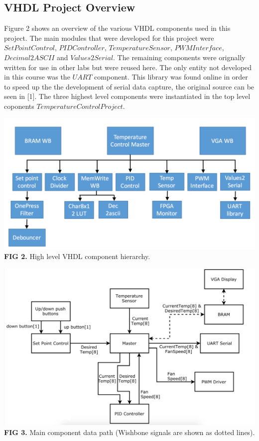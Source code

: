 \documentclass{article}
\begin{document}
\subsection{VHDL Project Overview}
Figure 2 shows an overview of the various VHDL components used in this project. The main modules that were developed for this project were $SetPointControl
$, $PIDController$, $TemperatureSensor$, $PWMInterface$, $Decimal2ASCII$ and $Values2Serial$. The remaining components were orignally written for use in other labs but were reused here. The only entity not developed in this course was the $UART$ component. This library was found online in order to speed up the the development of serial data capture, the original source can be seen in [1]. The three highest level components were instantiated in the top level coponents $TemperatureControlProject$.
\begin{center}
\includegraphics[scale=.35]{images/vhdl_arch}\\
\textbf{FIG 2.} High level VHDL component hierarchy.\\
\end{center}
 
\begin{center}
\includegraphics[scale=.4]{images/internalFlow}\\
\textbf{FIG 3.} Main component data path (Wishbone signals are shown as dotted lines).\\
\end{center}
\end{document}
